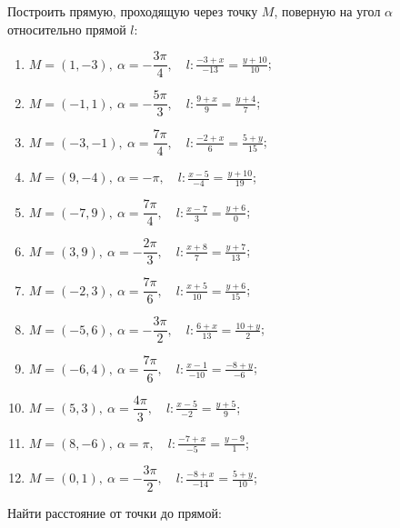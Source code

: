 	\vspace{15pt}
	Построить прямую, проходящую через точку $M$, поверную на угол $\alpha$ относительно прямой $l$:

	\begin{enumerate}
		\setcounter{enumi}{\value{tasks}}

			\item \( \displaystyle M = \left( 1, -3 \right), ~ \alpha = -\dfrac{3\pi}{4}, \quad l: \frac{-3+x}{-13} = \frac{y+10}{10} \);
			\item \( \displaystyle M = \left( -1, 1 \right), ~ \alpha = -\dfrac{5\pi}{3}, \quad l: \frac{9+x}{9} = \frac{y+4}{7} \);
			\item \( \displaystyle M = \left( -3, -1 \right), ~ \alpha = \dfrac{7\pi}{4}, \quad l: \frac{-2+x}{6} = \frac{5+y}{15} \);
			\item \( \displaystyle M = \left( 9, -4 \right), ~ \alpha = -\pi, \quad l: \frac{x-5}{-4} = \frac{y+10}{19} \);
			\item \( \displaystyle M = \left( -7, 9 \right), ~ \alpha = \dfrac{7\pi}{4}, \quad l: \frac{x-7}{3} = \frac{y+6}{0} \);
			\item \( \displaystyle M = \left( 3, 9 \right), ~ \alpha = -\dfrac{2\pi}{3}, \quad l: \frac{x+8}{7} = \frac{y+7}{13} \);
			\item \( \displaystyle M = \left( -2, 3 \right), ~ \alpha = \dfrac{7\pi}{6}, \quad l: \frac{x+5}{10} = \frac{y+6}{15} \);
			\item \( \displaystyle M = \left( -5, 6 \right), ~ \alpha = -\dfrac{3\pi}{2}, \quad l: \frac{6+x}{13} = \frac{10+y}{2} \);
			\item \( \displaystyle M = \left( -6, 4 \right), ~ \alpha = \dfrac{7\pi}{6}, \quad l: \frac{x-1}{-10} = \frac{-8+y}{-6} \);
			\item \( \displaystyle M = \left( 5, 3 \right), ~ \alpha = \dfrac{4\pi}{3}, \quad l: \frac{x-5}{-2} = \frac{y+5}{9} \);
			\item \( \displaystyle M = \left( 8, -6 \right), ~ \alpha = \pi, \quad l: \frac{-7+x}{-5} = \frac{y-9}{1} \);
			\item \( \displaystyle M = \left( 0, 1 \right), ~ \alpha = -\dfrac{3\pi}{2}, \quad l: \frac{-8+x}{-14} = \frac{5+y}{10} \);

		\setcounter{tasks}{\value{enumi}}
	\end{enumerate}

	\vspace{15pt}
	Найти расстояние от точки до прямой:

